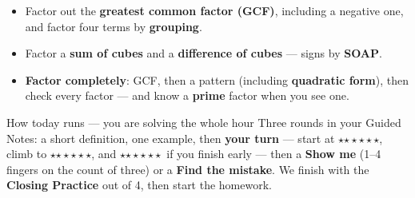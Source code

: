\documentclass[aspectratio=169, 11pt]{beamer}
\newcommand{\rung}[1]{{\color{goldacc}\ifcase#1\or$\star$\or$\star\star$\or$\star\star\star$\fi}}
\begin{document}
\begin{frame}[t, plain]
  \begin{itemize}\setlength{\itemsep}{3pt}
    \item Factor out the \textbf{greatest common factor (GCF)}, including a negative one, and
          factor four terms by \textbf{grouping}.
    \item Factor a \textbf{sum of cubes} and a \textbf{difference of cubes} --- signs by
          \textbf{SOAP}.
    \item \textbf{Factor completely}: GCF, then a pattern (including \textbf{quadratic form}),
          then check every factor --- and know a \textbf{prime} factor when you see one.
  \end{itemize}
  \vspace{3pt}
  \begin{block}{How today runs --- you are solving the whole hour}
    Three rounds in your Guided Notes: a short definition, one example, then \textbf{your turn}
    --- start at \rung1, climb to \rung2, and \rung3\ if you finish early --- then a \textbf{Show
    me} (1--4 fingers on the count of three) or a \textbf{Find the mistake}. We finish with the
    \textbf{Closing Practice} out of 4, then start the homework.
  \end{block}
\end{frame}
\end{document}
